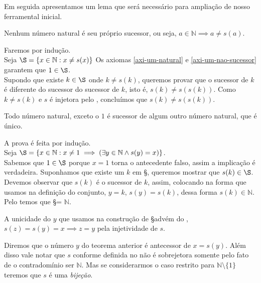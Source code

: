 \documentclass[../main.tex]{subfiles}
\begin{document}
Em seguida apresentamos um lema que será necessário para ampliação de nosso ferramental inicial.
\begin{lema}\label{n-dif-sucessor}
    Nenhum número natural é seu próprio sucessor, ou seja, $a \in \mathbb{N} \implies a \neq s(a) $.
\end{lema}
\begin{dem}
    Faremos por indução.\\
    Seja $\S = \{x \in \mathbb{N} : x \neq s(x) \}$
    Os axiomas \ref{axi-um-natural} e \ref{axi-um-nao-sucessor} garantem que $1 \in \S$.\\
    Supondo que existe $ k \in \S$ onde $ k \neq s(k)$, queremos provar que o sucessor de $k$ é diferente do sucessor do sucessor de $k$, isto é, $s(k) \neq s(s(k))$. Como $k \neq s(k)$ e $s$ é injetora pelo , concluímos que $s(k) \neq s(s(k))$.
\end{dem}
\begin{teo}\label{nat-suc-unico}
    Todo número natural, exceto o $1$ é sucessor de algum outro número natural, que é único.
\end{teo}
\begin{dem}
    A prova é feita por indução. \\ 
    Seja $\S = \{x \in \mathbb{N} : x \neq 1 \implies (\exists y \in \mathbb{N} \land s(y) = x) \}$.\\
    Sabemos que $1 \in \S$ porque $x = 1$ torna o antecedente falso, assim a implicação é verdadeira. Suponhamos que existe um $k$ em \S, queremos mostrar que $s(k) \in \S$. Devemos observar que $s(k)$ é o sucessor de $k$, assim, colocando na forma que usamos na definição do conjunto,
    $y = k$, $s(y) = s(k)$, dessa forma $s(k) \in \mathbb{N}$. Pelo  temos que \S = $\mathbb{N}$.

    A unicidade do $y$ que usamos na construção de \S advém do , $s(z) = s(y) = x \implies z = y$ pela injetividade de $s$.
\end{dem}
\begin{obs}
    Diremos que o número $y$ do teorema anterior é antecessor de $x = s(y)$. Além disso vale notar que $s$ conforme definida no  não é sobrejetora somente pelo fato de o contradomínio ser $\mathbb{N}$. Mas se considerarmos o caso restrito para $\mathbb{N} \setminus \{1\}$ 
    teremos que $s$ é uma \emph{bijeção}.
\end{obs}
\end{document}
